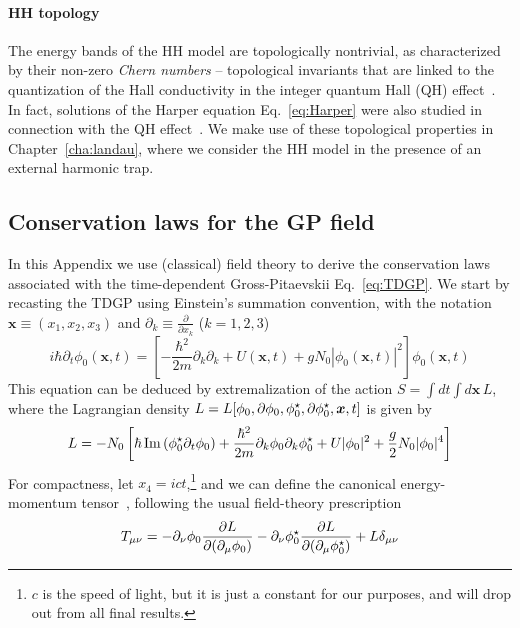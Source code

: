 \paragraph{HH topology}
The energy bands of the HH model are topologically nontrivial, as
characterized by their non-zero \textit{Chern numbers} -- topological
invariants that are linked to the quantization of the Hall
conductivity in the integer quantum Hall (QH)
effect~\cite{thouless}. In fact, solutions of the Harper equation
Eq.~\eqref{eq:Harper} were also studied in connection with the QH
effect~\cite{PhysRevB.39.11943}. We make use of these topological
properties in Chapter~\ref{cha:landau}, where we consider the HH model
in the presence of an external harmonic trap.


\begin{subappendices}
\section{Conservation laws for the GP field}
\label{app:field-theory}
%
In this Appendix we use (classical) field theory to derive the
conservation laws associated with the time-dependent Gross-Pitaevskii
Eq.~\eqref{eq:TDGP}. We start by recasting the TDGP using Einstein's
summation convention, with the notation $\bm{x} \equiv (x_1, x_2,
x_3)$ and $\partial_k \equiv \frac{\partial}{\partial x_k}$ ($k =
1,2,3$)
%
\begin{equation}\label{eq:GP-field}
    i\hbar\partial_t\phi_0(\bm{x},t) = 
  \left[-\frac{\hbar^2}{2m}\partial_k\partial_k + U(\bm{x},t) + g N_0 |\phi_0(\bm{x},t)|^2\right]\phi_0(\bm{x},t)
\end{equation}
% 
This equation can be deduced by extremalization of the action
$S = \int dt \int d\bm{x} \,L$, where the Lagrangian density
$L = L[\phi_{0}, \partial \phi_{0}, \phi_{0}^{\star}, \partial \phi_{0}^{\star}, \bm{x}, t]$ is given by
%
\begin{equation}\label{eq:GP-action}
  L = -N_0\left[\hbar \operatorname{Im}\left(\phi_{0}^{\star} \partial_t \phi_{0}\right) + 
\frac{\hbar^2}{2m}\partial_k\phi_{0}\partial_k\phi_{0}^{\star} + U\vert \phi_{0} \vert^2 + \frac{g}{2}N_0\vert \phi_{0} \vert^4 \right]
\end{equation}
% 
For compactness, let $x_4 = i c t$,\footnote{$c$ is the speed of
  light, but it is just a constant for our purposes, and will drop out
  from all final results.}  and we can define the canonical
energy-momentum tensor~\cite{Landau:101807}, following the usual
field-theory prescription~\cite{wentzel2003quantum}
%
\begin{equation}\label{eq:en-mom-tensor}
  T_{\mu \nu} = - \pa_{\nu} \p \frac{\pa L}{\pa (\pa_{\mu} \p)} - \pa_{\nu} \ps \frac{\pa L}{\pa (\pa_{\mu} \ps)} + L \delta_{\mu \nu}

\end{equation}
\end{subappendices}
